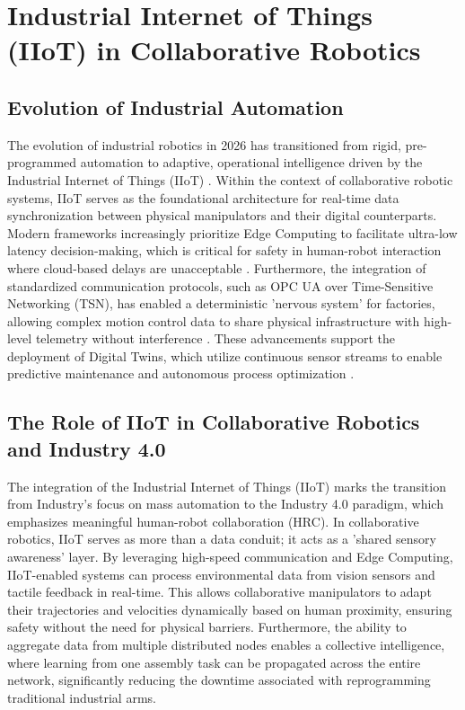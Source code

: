 \section{Industrial Internet of Things (IIoT) in Collaborative Robotics}

\subsection{Evolution of Industrial Automation}
The evolution of industrial robotics in 2026 has transitioned from rigid, pre-programmed automation to adaptive, operational intelligence driven by the Industrial Internet of Things (IIoT) \cite{esa2026robotics}. Within the context of collaborative robotic systems, IIoT serves as the foundational architecture for real-time data synchronization between physical manipulators and their digital counterparts. Modern frameworks increasingly prioritize Edge Computing to facilitate ultra-low latency decision-making, which is critical for safety in human-robot interaction where cloud-based delays are unacceptable \cite{viact2026iiot}. Furthermore, the integration of standardized communication protocols, such as OPC UA over Time-Sensitive Networking (TSN), has enabled a deterministic 'nervous system' for factories, allowing complex motion control data to share physical infrastructure with high-level telemetry without interference \cite{mierunski2026iot}. These advancements support the deployment of Digital Twins, which utilize continuous sensor streams to enable predictive maintenance and autonomous process optimization \cite{xu2023survey, lopes2025digital}.


\subsection{The Role of IIoT in Collaborative Robotics and Industry 4.0}

The integration of the Industrial Internet of Things (IIoT) marks the transition from Industry's focus on mass automation to the Industry 4.0 paradigm, which emphasizes meaningful human-robot collaboration (HRC). In collaborative robotics, IIoT serves as more than a data conduit; it acts as a 'shared sensory awareness' layer. By leveraging high-speed communication and Edge Computing, IIoT-enabled systems can process environmental data from vision sensors and tactile feedback in real-time. This allows collaborative manipulators to adapt their trajectories and velocities dynamically based on human proximity, ensuring safety without the need for physical barriers. Furthermore, the ability to aggregate data from multiple distributed nodes enables a collective intelligence, where learning from one assembly task can be propagated across the entire network, significantly reducing the downtime associated with reprogramming traditional industrial arms.
